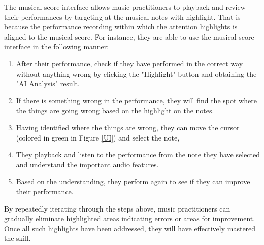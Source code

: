\documentclass[sigconf,review,anonymous]{acmart}
\begin{document}
The musical score interface allows music practitioners to playback and review their performances by targeting at the musical notes with highlight. That is because the performance recording within which the attention highlights is aligned to the musical score.
For instance, they are able to use the musical score interface in the following manner:
\begin{enumerate}
   \item After their performance, check if they have performed in the correct way without anything wrong by clicking the "Highlight" button and obtaining the "AI Analysis" result.
   \item If there is something wrong in the performance, they will find the spot where the things are going wrong based on the highlight on the notes.
   \item Having identified where the things are wrong, they can move the cursor (colored in green in Figure \ref{UI}) and select the note,
   \item They playback and listen to the performance from the note they have selected and understand the important audio features.
   \item Based on the understanding, they perform again to see if they can improve their performance.
 \end{enumerate}
By repeatedly iterating through the steps above, music practitioners can gradually eliminate highlighted areas indicating errors or areas for improvement. 
Once all such highlights have been addressed, they will have effectively mastered the skill.
\end{document}
